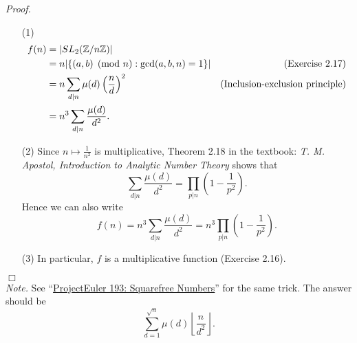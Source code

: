\documentclass{article}
\begin{document}
\emph{Proof.}
\begin{enumerate}
\item[(1)]
  \begin{align*}
    f(n)
    &= \abs{ SL_2(\mathbb{Z}/n\mathbb{Z}) } \\
    &= n \abs{ \{ (a,b) \pmod{n} : \gcd(a,b,n) = 1 \} }
      &(\text{Exercise 2.17}) \\
    &= n \sum_{d|n} \mu(d)\left( \frac{n}{d} \right)^2
      &(\text{Inclusion-exclusion principle}) \\
    &= n^3 \sum_{d|n} \frac{\mu(d)}{d^2}.
  \end{align*}

\item[(2)]
  Since $n \mapsto \frac{1}{n^2}$ is multiplicative,
  Theorem 2.18 in the textbook: \emph{T. M. Apostol, Introduction to Analytic Number Theory}
  shows that
  \[
    \sum_{d|n} \frac{\mu(d)}{d^2} = \prod_{p|n} \left(1 - \frac{1}{p^2}\right).
  \]
  Hence we can also write
  \[
    f(n) = n^3 \sum_{d|n} \frac{\mu(d)}{d^2} = n^3 \prod_{p|n} \left(1 - \frac{1}{p^2}\right).
  \]

\item[(3)]
  In particular,
  $f$ is a multiplicative function (Exercise 2.16).
\end{enumerate}
$\Box$ \\



\emph{Note.}
  See ``\href{https://projecteuler.net/problem=193}{ProjectEuler 193: Squarefree Numbers}''
  for the same trick.
  The answer should be
  \[
    \sum_{d=1}^{\sqrt{n}} \mu(d) \left\lfloor \frac{n}{d^2} \right\rfloor.
  \] \\\\



\end{document}

